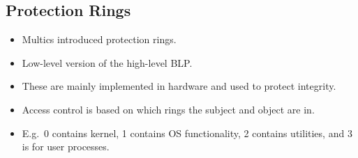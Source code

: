 \subsection{Protection Rings}

\begin{frame}
  \begin{itemize}
    \item Multics introduced protection rings.

    \item Low-level version of the high-level BLP.

    \item These are mainly implemented in hardware and used to protect 
      integrity.

    \item Access control is based on which rings the subject and object are in.

    \item E.g.\ 0 contains kernel, 1 contains OS functionality, 2 contains 
      utilities, and 3 is for user processes.

  \end{itemize}
\end{frame}


